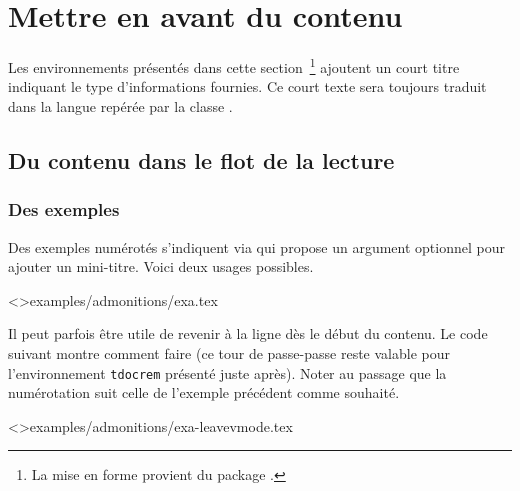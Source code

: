 \documentclass{../main/main}
\begin{document}
\section{Mettre en avant du contenu}

\begin{tdocnote}
    Les environnements présentés dans cette section\,%
    \footnote{
        La mise en forme provient du package .
    }
    ajoutent un court titre indiquant le type d'informations fournies.
    Ce court texte sera toujours traduit dans la langue repérée par la classe \thisproj.
\end{tdocnote}



\subsection{Du contenu dans le flot de la lecture}




\subsubsection{Des exemples}

Des exemples numérotés s'indiquent via  qui propose un argument optionnel pour ajouter un mini-titre.
Voici deux usages possibles.

\tdoclatexinput<>{examples/admonitions/exa.tex}


\begin{tdoctip}
    Il peut parfois être utile de revenir à la ligne dès le début du contenu. Le code suivant montre comment faire (ce tour de passe-passe reste valable pour l'environnement \verb#tdocrem# présenté juste après). Noter au passage que la numérotation suit celle de l'exemple précédent comme souhaité.
\end{tdoctip}

\tdoclatexinput<>{examples/admonitions/exa-leavevmode.tex}
\end{document}
